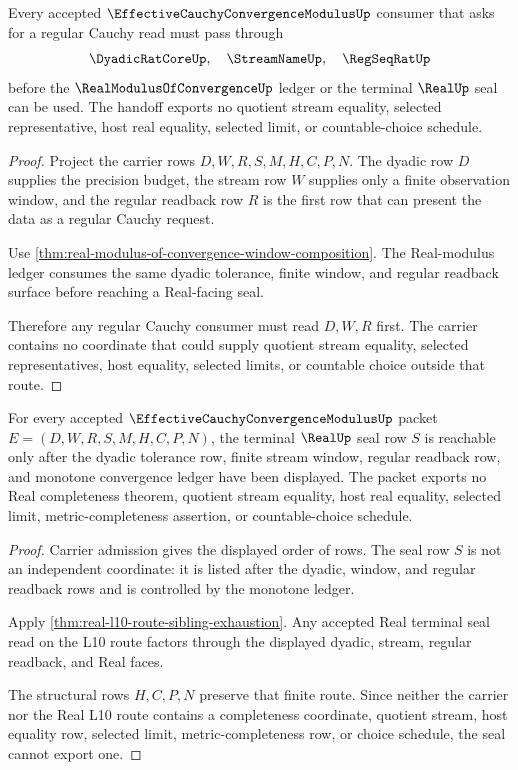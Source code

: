 \begin{theorem}
\label{thm:effective-cauchy-convergence-modulus-regseqrat-handoff}
Every accepted $\EffectiveCauchyConvergenceModulusUp$ consumer that asks for a regular Cauchy read must pass through
$$
\DyadicRatCoreUp,\quad \StreamNameUp,\quad \RegSeqRatUp
$$
before the $\RealModulusOfConvergenceUp$ ledger or the terminal $\RealUp$ seal can be used. The handoff exports no quotient stream equality, selected representative, host real equality, selected limit, or countable-choice schedule.
\end{theorem}
\begin{proof}
Project the carrier rows $D,W,R,S,M,H,C,P,N$. The dyadic row $D$ supplies the precision budget, the stream row $W$ supplies only a finite observation window, and the regular readback row $R$ is the first row that can present the data as a regular Cauchy request.

Use \autoref{thm:real-modulus-of-convergence-window-composition}. The Real-modulus ledger consumes the same dyadic tolerance, finite window, and regular readback surface before reaching a Real-facing seal.

Therefore any regular Cauchy consumer must read $D,W,R$ first. The carrier contains no coordinate that could supply quotient stream equality, selected representatives, host equality, selected limits, or countable choice outside that route.
\end{proof}

\begin{theorem}
\label{thm:effective-cauchy-convergence-modulus-real-seal-nonescape}
For every accepted $\EffectiveCauchyConvergenceModulusUp$ packet $E=(D,W,R,S,M,H,C,P,N)$, the terminal $\RealUp$ seal row $S$ is reachable only after the dyadic tolerance row, finite stream window, regular readback row, and monotone convergence ledger have been displayed. The packet exports no Real completeness theorem, quotient stream equality, host real equality, selected limit, metric-completeness assertion, or countable-choice schedule.
\end{theorem}
\begin{proof}
Carrier admission gives the displayed order of rows. The seal row $S$ is not an independent coordinate: it is listed after the dyadic, window, and regular readback rows and is controlled by the monotone ledger.

Apply \autoref{thm:real-l10-route-sibling-exhaustion}. Any accepted Real terminal seal read on the L10 route factors through the displayed dyadic, stream, regular readback, and Real faces.

The structural rows $H,C,P,N$ preserve that finite route. Since neither the carrier nor the Real L10 route contains a completeness coordinate, quotient stream, host equality row, selected limit, metric-completeness row, or choice schedule, the seal cannot export one.
\end{proof}

